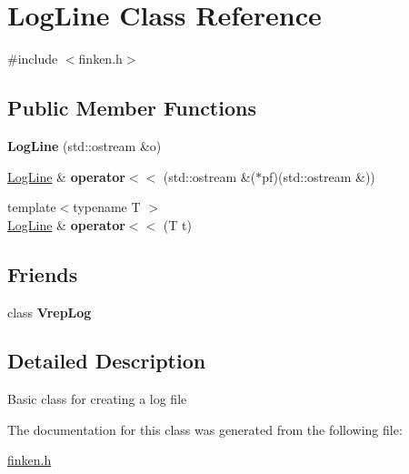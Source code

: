 \hypertarget{classLogLine}{}\section{Log\+Line Class Reference}
\label{classLogLine}


{\ttfamily \#include $<$finken.\+h$>$}

\subsection*{Public Member Functions}
\begin{DoxyCompactItemize}
\item 
{\bfseries Log\+Line} (std\+::ostream \&o)\hypertarget{classLogLine_a7f1c876fef642fffb06f646749662a04}{}\label{classLogLine_a7f1c876fef642fffb06f646749662a04}

\item 
\hyperlink{classLogLine}{Log\+Line} \& {\bfseries operator$<$$<$} (std\+::ostream \&($\ast$pf)(std\+::ostream \&))\hypertarget{classLogLine_a9697d8126ee9dd2ee3ea70bc61abf4b8}{}\label{classLogLine_a9697d8126ee9dd2ee3ea70bc61abf4b8}

\item 
{\footnotesize template$<$typename T $>$ }\\\hyperlink{classLogLine}{Log\+Line} \& {\bfseries operator$<$$<$} (T t)\hypertarget{classLogLine_aa9dff12f0c1466e53e63f981872f1e76}{}\label{classLogLine_aa9dff12f0c1466e53e63f981872f1e76}

\end{DoxyCompactItemize}
\subsection*{Friends}
\begin{DoxyCompactItemize}
\item 
class {\bfseries Vrep\+Log}\hypertarget{classLogLine_a4b85b5c9be56c4b49e99130f36f2df1d}{}\label{classLogLine_a4b85b5c9be56c4b49e99130f36f2df1d}

\end{DoxyCompactItemize}


\subsection{Detailed Description}
Basic class for creating a log file 

The documentation for this class was generated from the following file\+:\begin{DoxyCompactItemize}
\item 
\hyperlink{finken_8h}{finken.\+h}\end{DoxyCompactItemize}
